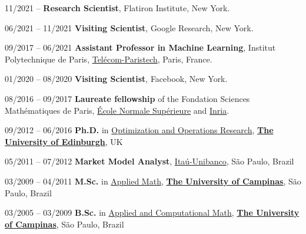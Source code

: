 \begin{bibsection}	
\item [11/2021 -- \phantom{11/2021}]  \textbf{Research Scientist}, Flatiron Institute, New York.
\item [06/2021 -- 11/2021]  \textbf{Visiting Scientist}, Google Research, New York.
\item [09/2017 -- 06/2021]  \textbf{Assistant Professor in Machine Learning}, 
Institut Polytechnique de Paris, \href{www.telecom-paristech.fr}{Tel\'ecom-Paristech}, Paris, France.
\item [01/2020 -- 08/2020]  \textbf{Visiting Scientist},  Facebook, New York.
\item [08/2016 -- 09/2017]  \textbf{Laureate fellowship} of the Fondation Sciences Math\'ematiques de Paris, 
\href{www.ens.fr}{ \'Ecole Normale Sup\'erieure} and \href{www.Inria.fr}{Inria}. 
 
\item [09/2012 -- 06/2016]  \textbf{Ph.D.} in \href{http://www.maths.ed.ac.uk/ERGO/index.html} {Optimization and Operations Research}, 	\href{http://www.ed.ac.uk/}{\textbf{The University of Edinburgh}}, UK 

\item [05/2011 -- 07/2012]  \textbf{Market Model Analyst}, \href{ www.itau-unibanco.com.br}{Ita\'u-Unibanco}, S\~ao Paulo, Brazil  

\item [03/2009 -- 04/2011] \textbf{M.Sc.} in \href{http://www.ime.unicamp.br/} {Applied Math}, \href{http://www.unicamp.br/unicamp/?language=en}{\textbf{The University of Campinas}}, S\~ao Paulo,  Brazil

\item [03/2005 -- 03/2009] \textbf{B.Sc.} in  \href{http://www.ime.unicamp.br/}
	{Applied and Computational Math}, \href{http://www.unicamp.br/unicamp/?language=en}{\textbf{The University of Campinas}},  S\~ao Paulo,  Brazil
\end{bibsection}

